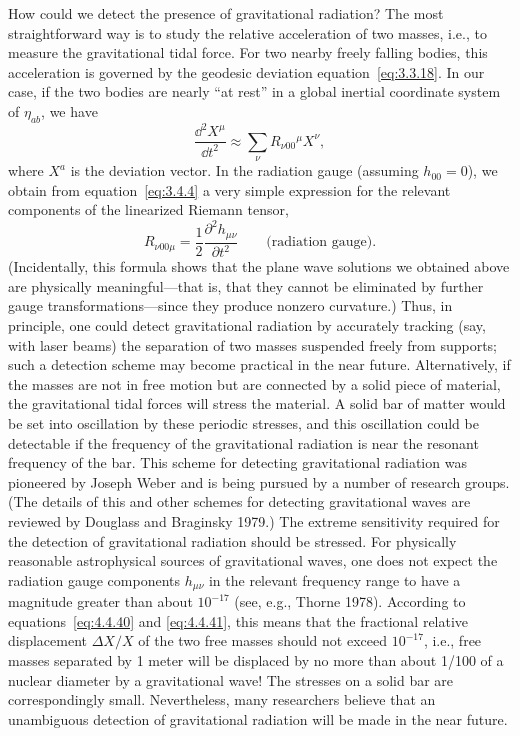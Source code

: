How could we detect the presence of gravitational radiation? The most
straightforward way is to study the relative acceleration of two masses, i.e., to
measure the gravitational tidal force. For two nearby freely falling bodies, this
acceleration is governed by the geodesic deviation equation~\eqref{eq:3.3.18}. In
our case, if the two bodies are nearly ``at rest'' in a global inertial coordinate system
of \(\eta_{ab}\), we have
\begin{equation}
  \frac{\dd^2X^\mu}{\dd t^2}\approx
    \sum_\nu R_{\nu00}{}^\mu X^\nu ,
  \tag{4.4.40}\label{eq:4.4.40}
\end{equation}
where \(X^a\) is the deviation vector. In the radiation gauge (assuming
\(h_{00}=0\)), we obtain from equation~\eqref{eq:3.4.4} a very simple expression
for the relevant components of the linearized Riemann tensor,
\begin{equation}
  R_{\nu00\mu}=\frac12\frac{\partial^2h_{\mu\nu}}{\partial t^2}
  \qquad\text{(radiation gauge)} .
  \tag{4.4.41}\label{eq:4.4.41}
\end{equation}
(Incidentally, this formula shows that the plane wave solutions we obtained above
are physically meaningful---that is, that they cannot be eliminated by further gauge
transformations---since they produce nonzero curvature.) Thus, in principle, one
could detect gravitational radiation by accurately tracking (say, with laser beams)
the separation of two masses suspended freely from supports; such a detection
scheme may become practical in the near future. Alternatively, if the masses are not
in free motion but are connected by a solid piece of material, the gravitational tidal
forces will stress the material. A solid bar of matter would be set into oscillation by
these periodic stresses, and this oscillation could be detectable if the frequency of
the gravitational radiation is near the resonant frequency of the bar. This scheme
for detecting gravitational radiation was pioneered by Joseph Weber and is being
pursued by a number of research groups. (The details of this and other schemes for
detecting gravitational waves are reviewed by Douglass and Braginsky 1979.) The
extreme sensitivity required for the detection of gravitational radiation should be
stressed. For physically reasonable astrophysical sources of gravitational waves,
one does not expect the radiation gauge components \(h_{\mu\nu}\) in the relevant
frequency range to have a magnitude greater than about \(10^{-17}\) (see, e.g.,
Thorne 1978). According to equations~\eqref{eq:4.4.40} and \eqref{eq:4.4.41}, this
means that the fractional relative displacement \(\Delta X/X\) of the two free
masses should not exceed \(10^{-17}\), i.e., free masses separated by 1 meter will
be displaced by no more than about 1/100 of a nuclear diameter by a gravitational
wave! The stresses on a solid bar are correspondingly small. Nevertheless, many
researchers believe that an unambiguous detection of gravitational radiation will be
made in the near future.

